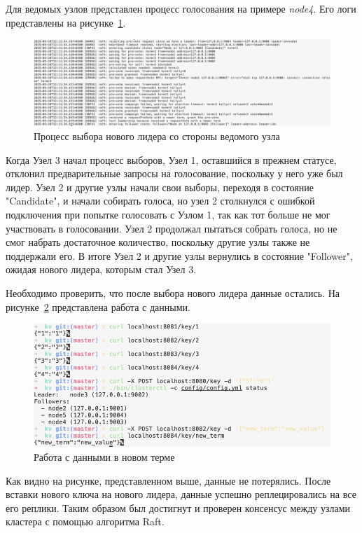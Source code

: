 Для ведомых узлов представлен процесс голосования на примере \textit{node4}. Его логи представлены на рисунке~\ref{fig:fig14}.

\begin{figure}
  \centering
  \includegraphics[scale=0.28]{assets/follower_election.png}
  \caption{Процесс выбора нового лидера со стороны ведомого узла}
  \label{fig:fig14}
\end{figure}

Когда Узел 3 начал процесс выборов, Узел 1, оставшийся в прежнем статусе, отклонил предварительные запросы на голосование, поскольку у него уже был лидер.
Узел 2 и другие узлы начали свои выборы, переходя в состояние "Candidate", и начали собирать голоса, но узел 2 столкнулся с ошибкой подключения при попытке
голосовать с Узлом 1, так как тот больше не мог участвовать в голосовании. Узел 2 продолжал пытаться собрать голоса, но не смог набрать достаточное количество,
поскольку другие узлы также не поддержали его. В итоге Узел 2 и другие узлы вернулись в состояние "Follower", ожидая нового лидера, которым стал Узел 3.

Необходимо проверить, что после выбора нового лидера данные остались. На рисунке~\ref{fig:fig15} представлена работа с данными.

\begin{figure}
  \centering
  \includegraphics[scale=0.5]{assets/new_term_crud.png}
  \caption{Работа с данными в новом терме}
  \label{fig:fig15}
\end{figure}

Как видно на рисунке, представленном выше, данные не потерялись. После вставки нового ключа на нового лидера, данные успешно реплецировались на все его реплики.
Таким образом был достигнут и проверен консенсус между узлами кластера с помощью алгоритма Raft.

